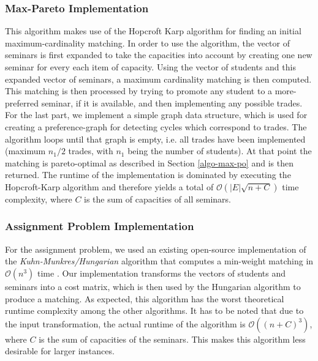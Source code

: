 \subsubsection{Max-Pareto Implementation}\label{impl:maxpo}
This algorithm makes use of the Hopcroft Karp algorithm for finding an initial maximum-cardinality matching. In order to use the algorithm, the vector of seminars is first expanded to take the capacities into account by creating one new seminar for every each item of capacity. Using the vector of students and this expanded vector of seminars, a maximum cardinality matching is then computed. This matching is then processed by trying to promote any student to a more-preferred seminar, if it is available, and then implementing any possible trades. For the last part, we implement a simple graph data structure, which is used for creating a preference-graph for detecting cycles which correspond to trades. The algorithm loops until that graph is empty, i.e. all trades have been implemented (maximum $n_1/2$ trades, with $n_1$ being the number of students). At that point the matching is pareto-optimal as described in Section \ref{algo-max-po} and is then returned. The runtime of the implementation is dominated by executing the Hopcroft-Karp algorithm and therefore yields a total of $\mathcal{O}(|E|\sqrt{n+C})$ time complexity, where $C$ is the sum of capacities of all seminars.

\subsubsection{Assignment Problem Implementation}
For the assignment problem, we used an existing open-source implementation of the \emph{Kuhn-Munkres/Hungarian} algorithm that computes a min-weight matching in $\mathcal{O}(n^3)$ time \cite{HungarianGithub}. Our implementation transforms the vectors of students and seminars into a cost matrix, which is then used by the Hungarian algorithm to produce a matching. As expected, this algorithm has the worst theoretical runtime complexity among the other algorithms. It has to be noted that due to the input transformation, the actual runtime of the algorithm is $\mathcal{O}((n + C)^3)$, where $C$ is the sum of capacities of the seminars. This makes this algorithm less desirable for larger instances.

